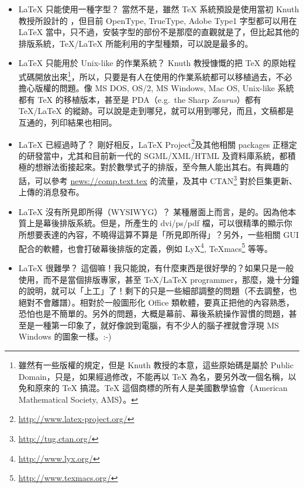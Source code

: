\begin{itemize}

  \item \LaTeX{} 只能使用一種字型？ \newline
  當然不是，雖然 \TeX{} 系統預設是使用當初 Knuth 教授所設計的 \MF{}，但目前 OpenType, TrueType, Adobe Type1 字型都可以用在 \LaTeX{} 當中，只不過，安裝字型的部份不是那麼的直觀就是了，但比起其他的排版系統，\TeX{}/\LaTeX{} 所能利用的字型種類，可以說是最多的。

  \item \LaTeX{} 只能用於 Unix-like 的作業系統？ \newline
  Knuth 教授慷慨的把 \TeX{} 的原始程式碼開放出來\footnote{雖然有一些版權的規定，但是 Knuth 教授的本意，這些原始碼是屬於 Public Domain，只是，如果經過修改，不能再以 \TeX{} 為名，要另外改一個名稱，以免和原來的 \TeX{} 搞混。\TeX{} 這個商標的所有人是美國數學協會（American Mathematical Society, AMS）。}，所以，只要是有人在使用的作業系統都可以移植過去，不必擔心版權的問題。像 MS DOS, OS/2, MS Windows, Mac OS, Unix-like 系統都有 \TeX{} 的移植版本，甚至是 PDA（e.g.~the Sharp \textsl{Zaurus}）都有 \TeX{}/\LaTeX{} 的縱跡。可以說是走到哪兒，就可以用到哪兒，而且，文稿都是互通的，列印結果也相同。

  \item \LaTeX{} 已經過時了？ \newline
  剛好相反，\LaTeX{} Project\footnote{\url{http://www.latex-project.org/}}及其他相關 packages 正穩定的研發當中，尤其和目前新一代的 SGML/XML/HTML 及資料庫系統，都積極的想辦法銜接起來。對於數學式子的排版，至今無人能出其右。有興趣的話，可以參考 \url{news://comp.text.tex} 的流量，及其中 \textsc{CTAN}\footnote{\url{http://tug.ctan.org/}} 對於巨集更新、上傳的消息發布。

  \item \LaTeX{} 沒有所見即所得（WYSIWYG）？ \newline
  某種層面上而言，是的。因為他本質上是幕後排版系統。但是，所產生的 dvi/ps/pdf 檔，可以很精準的顯示你所想要表達的內容，不曉得這算不算是「所見即所得」？另外，一些相關 GUI 配合的軟體，也會打破幕後排版的定義，例如 LyX\footnote{\url{http://www.lyx.org/}}, \TeX{}macs\footnote{\url{http://www.texmacs.org/}} 等等。

  \item \LaTeX{} 很難學？ \newline
  這個嘛！我只能說，有什麼東西是很好學的？如果只是一般使用，而不是當個排版專家，甚至 \TeX{}/\LaTeX{} programmer，那麼，幾十分鐘的說明，就可以「上工」了！剩下的只是一些細部調整的問題（不去調整，也絕對不會離譜）。相對於一般圖形化 Office 類軟體，要真正把他的內容熟悉，恐怕也是不簡單的。另外的問題，大概是幕前、幕後系統操作習慣的問題，甚至是一種第一印象了，就好像說到電腦，有不少人的腦子裡就會浮現 MS Windows 的圖象一樣。:-)


\end{itemize}
